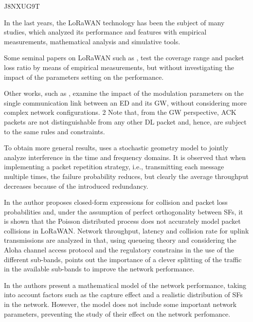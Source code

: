 \cite{magrin_thorough_2019} J8NXUG9T

In the last years,
	the LoRaWAN technology has been the subject of many studies,
	which analyzed its performance and features with empirical measurements,
	mathematical analysis and simulative tools.

Some seminal papers on LoRaWAN such as \cite{petajajarvi_coverage_2015},
	\cite{wixted_evaluation_2016} test the coverage range and packet loss ratio by means of empirical measurements,
	but without investigating the impact of the parameters setting on the performance.

Other works,
	such as \cite{bor_lora_2017},
	examine the impact of the modulation parameters on the single communication link between an ED and its GW,
	without considering more complex network configurations.
2 Note that,
	from the GW perspective,
	ACK packets are not distinguishable from any other DL packet and,
	hence,
	are subject to the same rules and constraints.

To obtain more general results,
	\cite{li_2d_2016} uses a stochastic geometry model to jointly analyze interference in the time and frequency domains.
It is observed that when implementing a packet repetition strategy,
	i.e.,
	transmitting each message multiple times,
	the failure probability reduces,
	but clearly the average throughput decreases because of the introduced redundancy.

In \cite{ferre_collision_2017} the author proposes closed-form expressions for collision and packet loss probabilities and,
	under the assumption of perfect orthogonality between SFs,
	it is shown that the Poisson distributed process does not accurately model packet collisions in LoRaWAN.
Network throughput,
	latency and collision rate for uplink transmissions are analyzed in \cite{sorensen_analysis_2017} that,
	using queueing theory and considering the Aloha channel access protocol and the regulatory constrains in the use of the different sub-bands,
	points out the importance of a clever splitting of the traffic in the available sub-bands to improve the network performance.

In \cite{bankov_mathematical_2017} the authors present a mathematical model of the network performance,
	taking into account factors such as the capture effect and a realistic distribution of SFs in the network.
However,
	the model does not include some important network parameters,
	preventing the study of their effect on the network perfomance.

